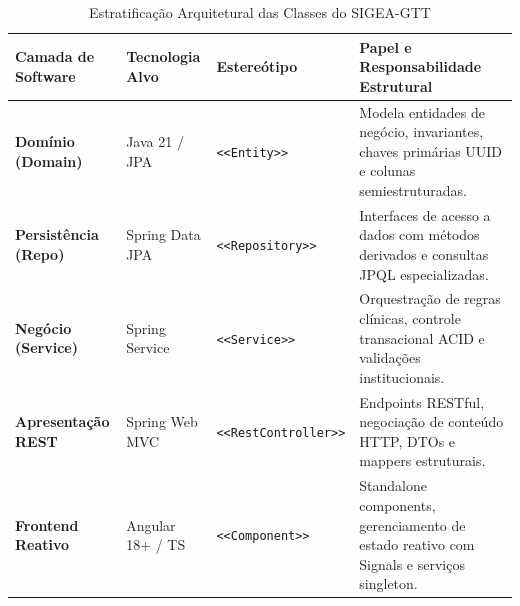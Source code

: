 \begin{table}[!ht]
\centering
\caption{Estratificação Arquitetural das Classes do SIGEA-GTT}
\label{tab_arquitetura_camadas_classes}
\footnotesize
\begin{tabularx}{\textwidth}{p{3.0cm} p{2.6cm} p{3.2cm} X}
\toprule
\textbf{Camada de Software} & \textbf{Tecnologia Alvo} & \textbf{Estereótipo} & \textbf{Papel e Responsabilidade Estrutural} \\
\midrule
\textbf{Domínio (Domain)} & Java 21 / JPA & \texttt{<<Entity>>} & Modela entidades de negócio, invariantes, chaves primárias UUID e colunas semiestruturadas. \\
\textbf{Persistência (Repo)} & Spring Data JPA & \texttt{<<Repository>>} & Interfaces de acesso a dados com métodos derivados e consultas JPQL especializadas. \\
\textbf{Negócio (Service)} & Spring Service & \texttt{<<Service>>} & Orquestração de regras clínicas, controle transacional ACID e validações institucionais. \\
\textbf{Apresentação REST} & Spring Web MVC & \texttt{<<RestController>>} & Endpoints RESTful, negociação de conteúdo HTTP, DTOs e mappers estruturais. \\
\textbf{Frontend Reativo} & Angular 18+ / TS & \texttt{<<Component>>} & Standalone components, gerenciamento de estado reativo com Signals e serviços singleton. \\
\bottomrule
\end{tabularx}
\end{table}
